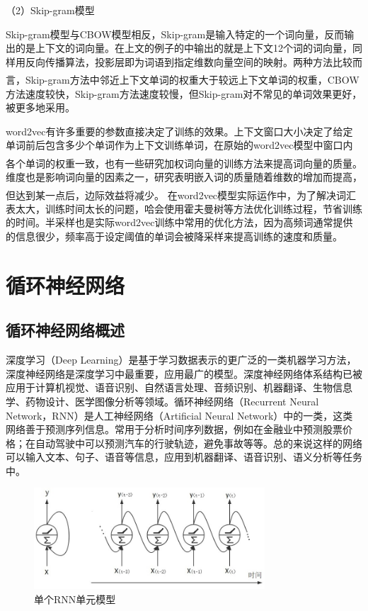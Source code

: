 \documentclass[winfonts,master,oneside,nobackinfo]{njuthesis}
\newcommand{\upcite}[1]{\textsuperscript{\textsuperscript{\cite{#1}}}}
\begin{document}
（2）Skip-gram模型

Skip-gram模型与CBOW模型相反，Skip-gram是输入特定的一个词向量，反而输出的是上下文的词向量。在上文的例子的中输出的就是上下文12个词的词向量，同样用反向传播算法，投影层即为词语到指定维数向量空间的映射。两种方法比较而言，Skip-gram方法中邻近上下文单词的权重大于较远上下文单词的权重\upcite{Mikolov1}，CBOW方法速度较快，Skip-gram方法速度较慢，但Skip-gram对不常见的单词效果更好，被更多地采用。

word2vec有许多重要的参数直接决定了训练的效果。上下文窗口大小决定了给定单词前后包含多少个单词作为上下文训练单词，在原始的word2vec模型中窗口内各个单词的权重一致，也有一些研究加权词向量的训练方法\upcite{myh}来提高词向量的质量。维度也是影响词向量的因素之一，研究表明嵌入词的质量随着维数的增加而提高，但达到某一点后，边际效益将减少\upcite{Mikolov}。
在word2vec模型实际运作中，为了解决词汇表太大，训练时间太长的问题，哈会使用霍夫曼树等方法优化训练过程，节省训练的时间。半采样也是实际word2vec训练中常用的优化方法，因为高频词通常提供的信息很少，频率高于设定阈值的单词会被降采样来提高训练的速度和质量。

\section{循环神经网络}

\subsection{循环神经网络概述}

深度学习（Deep Learning）是基于学习数据表示的更广泛的一类机器学习方法，深度神经网络是深度学习中最重要，应用最广的模型。深度神经网络体系结构已被应用于计算机视觉、语音识别、自然语言处理、音频识别、机器翻译、生物信息学、药物设计、医学图像分析等领域。循环神经网络（Recurrent Neural Network，RNN）是人工神经网络（Artificial Neural Network）中的一类，这类网络善于预测序列信息。常用于分析时间序列数据，例如在金融业中预测股票价格；在自动驾驶中可以预测汽车的行驶轨迹，避免事故等等。总的来说这样的网络可以输入文本、句子、语音等信息，应用到机器翻译、语音识别、语义分析等任务中。

\begin{figure}[h]
\centering
\includegraphics[width=0.77\textwidth]{./figure/RNN.jpg}
\caption{单个RNN单元模型}
\label{one-level-rnn}
\end{figure}
\end{document}
